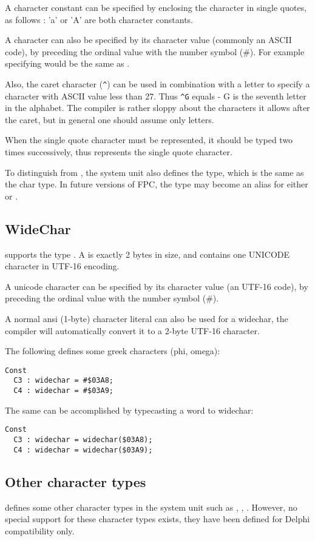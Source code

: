 A character constant can be specified by enclosing the character in single
quotes, as follows : 'a' or 'A' are both character constants.

A character can also be specified by its character
value (commonly an ASCII code), by preceding the ordinal value with the 
number symbol (\#). For example specifying  would be the same as .

Also, the caret character (\verb+^+) can be used in combination with a letter to
specify a character with ASCII value less than 27. Thus \verb+^G+ equals
 - G is the seventh letter in the alphabet. The compiler is rather
sloppy about the characters it allows after the caret, but in general one 
should assume only letters.

When the single quote character must be represented, it should be typed
two times successively, thus  represents the single quote character.

To distinguish  from , the system unit also defines
the  type, which is the same as the char type. In future
versions of FPC, the  type may become an alias for either  
or .

\subsection{WideChar}
 
\fpc supports the type . A  is exactly 2 bytes in
size, and contains one UNICODE character in UTF-16 encoding.

A unicode character can be specified by its character value 
(an UTF-16 code), by preceding the ordinal value with the number symbol (\#). 

A normal ansi (1-byte) character literal can also be used for a widechar,
the compiler will automatically convert it to a 2-byte UTF-16 character.

The following defines some greek characters (phi, omega):
\begin{verbatim}
Const
  C3 : widechar = #$03A8;
  C4 : widechar = #$03A9;
\end{verbatim}
The same can be accomplished by typecasting a word to widechar:
\begin{verbatim}
Const
  C3 : widechar = widechar($03A8);
  C4 : widechar = widechar($03A9);
\end{verbatim}

\subsection{Other character types}
\fpc defines some other character types in the system unit such as
, , . 
However, no special support for these character types exists, they have been
defined for Delphi compatibility only.

